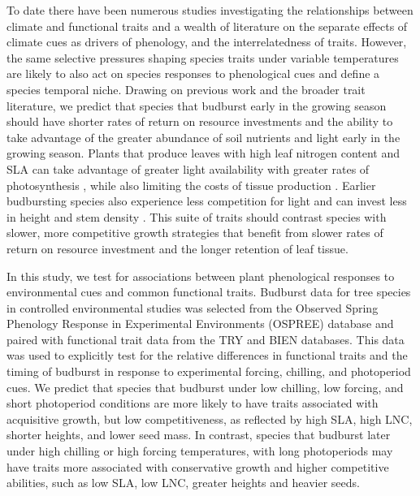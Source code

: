 \documentclass{article}\usepackage[]{graphicx}\usepackage[]{color}
\begin{document}
To date there have been numerous studies investigating the relationships between climate and functional traits and a wealth of literature on the separate effects of climate cues as drivers of phenology, and the interrelatedness of traits. However, the same selective pressures shaping species traits under variable temperatures are likely to also act on species responses to phenological cues and define a species temporal niche. Drawing on previous work and the broader trait literature, we predict that species that budburst early in the growing season should have shorter rates of return on resource investments and the ability to take advantage of the greater abundance of soil nutrients and light early in the growing season. Plants that produce leaves with high leaf nitrogen content and SLA can take advantage of greater light availability with greater rates of photosynthesis \citep{Wright2004,Pereira2020}, while also limiting the costs of tissue production \citep{Lambers2004, Westoby2006, Herault2011}. Earlier budbursting species also experience less competition for light and can invest less in height and stem density \citep{Laughlin2010}. This suite of traits should contrast species with slower, more competitive growth strategies that benefit from slower rates of return on resource investment and the longer retention of leaf tissue. 

In this study, we test for associations between plant phenological responses to environmental cues and common functional traits. Budburst data for tree species in controlled environmental studies was selected from the Observed Spring Phenology Response in Experimental Environments (OSPREE) database and paired with functional trait data from the TRY and BIEN databases. This data was used to explicitly test for the relative differences in functional traits and the timing of budburst in response to experimental forcing, chilling, and photoperiod cues. We predict that species that budburst under low chilling, low forcing, and short photoperiod conditions are more likely to have traits associated with acquisitive growth, but low competitiveness, as reflected by high SLA, high LNC, shorter heights, and lower seed mass. In contrast, species that budburst later under high chilling or high forcing temperatures, with long photoperiods may have traits more associated with conservative growth and higher competitive abilities, such as low SLA, low LNC, greater heights and heavier seeds. 

\end{document}
